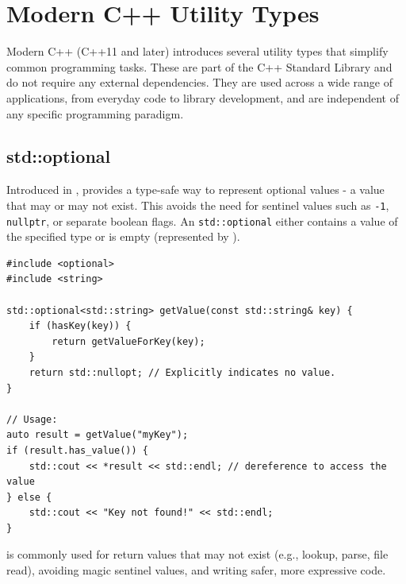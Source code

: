 \section{Modern C++ Utility Types}
Modern C++ (C++11 and later) introduces several utility types that simplify common programming tasks. These are part of the C++ Standard Library and do not require any external dependencies. They are used across a wide range of applications, from everyday code to library development, and are independent of any specific programming paradigm.

\subsection{std::optional}
Introduced in ,  provides a type-safe way to represent optional values - a value that may or may not exist. This avoids the need for sentinel values such as \texttt{-1}, \texttt{nullptr}, or separate boolean flags. An \texttt{std::optional} either contains a value of the specified type or is empty (represented by ).
\begin{lstlisting}
#include <optional>
#include <string>

std::optional<std::string> getValue(const std::string& key) {
    if (hasKey(key)) {
        return getValueForKey(key);
    }
    return std::nullopt; // Explicitly indicates no value.
}

// Usage:
auto result = getValue("myKey");
if (result.has_value()) {
    std::cout << *result << std::endl; // dereference to access the value
} else {
    std::cout << "Key not found!" << std::endl;
}
\end{lstlisting}
 is commonly used for return values that may not exist (e.g., lookup, parse, file read), avoiding magic sentinel values, and writing safer, more expressive code.

